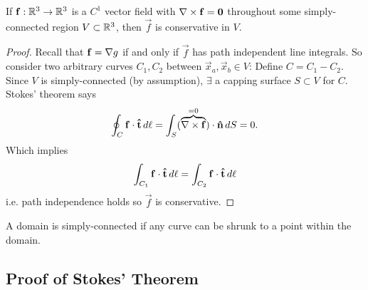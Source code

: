 \documentclass[10pt, a4paper]{article}
\begin{document}
\begin{corollary}
    If $\mathbf{f} : \mathbb{R} ^ 3 \to \mathbb{R} ^ 3$ is a $C ^ {1}$ vector field with $\mathbf{\nabla} \times \mathbf{f} = \mathbf{0}$ throughout some simply-connected region $V \subset \mathbb{R} ^ 3$,
    then $\vec{f}$ is conservative in $V$.

    \begin{proof}
        Recall that $\mathbf{f} = \mathbf{\nabla} g$ if and only if $\vec{f}$ has path independent line integrals.
        So consider two arbitrary curves $C_1, C_2$ between $\vec{x}_a, \vec{x}_b \in V$:
        Define $C = C_1 - C_2$.
        Since $V$ is simply-connected
        (by assumption),
        $\exists$ a capping surface $S \subset V$ for $C$.
        Stokes' theorem says
        \[
        \oint_{C}\mathbf{f}\cdot\mathbf{\hat{t}}\,d\ell = \int_{S}(\overbrace{\mathbf{\nabla} \times \mathbf{f}}^{= 0}) \cdot \mathbf{\hat{n}}\,dS = 0.
        \]
        Which implies
        \[
        \int_{C_1}\mathbf{f}\cdot\mathbf{\hat{t}}\,d\ell = \int_{C_2}\mathbf{f}\cdot\mathbf{\hat{t}}\,d\ell
        \]
        i.e. path independence holds so $\vec{f}$ is conservative.
    \end{proof}
\end{corollary}
A domain is simply-connected if any curve can be shrunk to a point within the domain.

\subsection{Proof of Stokes' Theorem}
\end{document}
